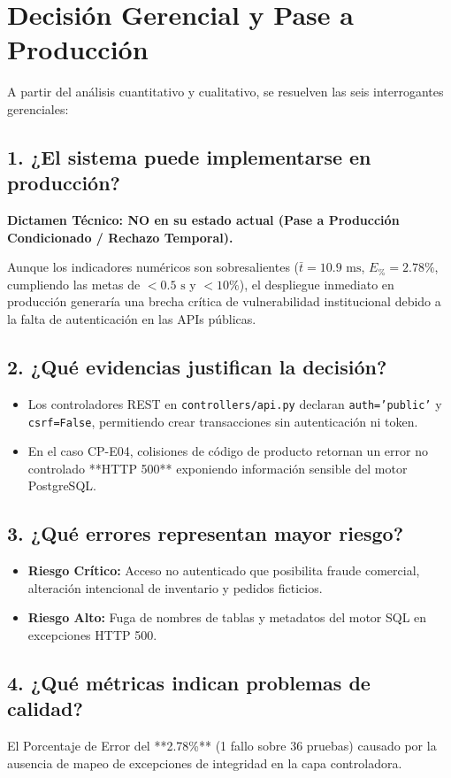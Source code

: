 \documentclass{article}
\begin{document}
\section{Decisión Gerencial y Pase a Producción}
A partir del análisis cuantitativo y cualitativo, se resuelven las seis interrogantes gerenciales:

\subsection{1. ¿El sistema puede implementarse en producción?}
\textbf{Dictamen Técnico: NO en su estado actual (Pase a Producción Condicionado / Rechazo Temporal).}

Aunque los indicadores numéricos son sobresalientes ($\bar{t} = 10.9\text{ ms}$, $E_{\%} = 2.78\%$, cumpliendo las metas de $< 0.5\text{ s}$ y $< 10\%$), el despliegue inmediato en producción generaría una brecha crítica de vulnerabilidad institucional debido a la falta de autenticación en las APIs públicas.

\subsection{2. ¿Qué evidencias justifican la decisión?}
\begin{itemize}
\item Los controladores REST en \texttt{controllers/api.py} declaran \texttt{auth='public'} y \texttt{csrf=False}, permitiendo crear transacciones sin autenticación ni token.
\item En el caso CP-E04, colisiones de código de producto retornan un error no controlado **HTTP 500** exponiendo información sensible del motor PostgreSQL.
\end{itemize}

\subsection{3. ¿Qué errores representan mayor riesgo?}
\begin{itemize}
\item \textbf{Riesgo Crítico:} Acceso no autenticado que posibilita fraude comercial, alteración intencional de inventario y pedidos ficticios.
\item \textbf{Riesgo Alto:} Fuga de nombres de tablas y metadatos del motor SQL en excepciones HTTP 500.
\end{itemize}

\subsection{4. ¿Qué métricas indican problemas de calidad?}
El Porcentaje de Error del **2.78\%** (1 fallo sobre 36 pruebas) causado por la ausencia de mapeo de excepciones de integridad en la capa controladora.
\end{document}
